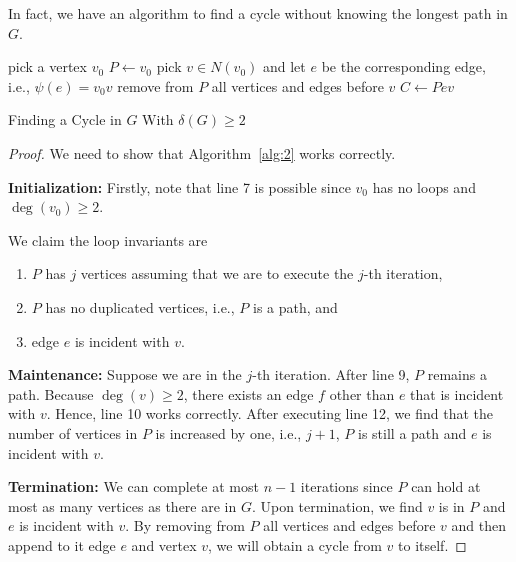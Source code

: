 \documentclass[thmcnt=section, 12pt, color=cyan]{my-elegantbook}
\begin{document}
In fact, we have an algorithm to find a cycle without knowing the longest path in $G$.

\begin{algorithm}[ht]
    pick a vertex $v_0$ \; 
    $P \gets v_0$ \;
    pick $v \in N(v_0)$ and let $e$ be the corresponding edge, i.e., $\psi(e) = v_0 v$ \;
    remove from $P$ all vertices and edges before $v$ \;
    $C \gets P e v$ \;
    \caption{Finding a Cycle in $G$ With $\delta(G) \geq 2$}
    \label{alg:2}
\end{algorithm}

\begin{proof}
We need to show that Algorithm~\ref{alg:2} works correctly. 
    
\noindent \textbf{Initialization:} Firstly, note that line 7 is possible 
since $v_0$ has no loops and $\deg(v_0) \geq 2$. 

We claim the loop invariants are
\begin{enumerate}
    \item $P$ has $j$ vertices assuming that 
		we are to execute the $j$-th iteration,
    \item $P$ has no duplicated vertices, i.e., $P$ is a path, and
    \item edge $e$ is incident with $v$.
\end{enumerate}

\noindent \textbf{Maintenance:} Suppose we are in the $j$-th iteration. 
After line 9, $P$ remains a path. Because $\deg(v) \geq 2$, 
there exists an edge $f$ other than $e$ that is incident with $v$. 
Hence, line 10 works correctly. 
After executing line 12, we find that the number of vertices in $P$ is increased by one, i.e., $j+1$, 
$P$ is still a path and $e$ is incident with $v$.

\noindent \textbf{Termination:} We can complete at most $n-1$ iterations 
since $P$ can hold at most as many vertices as there are in $G$. 
Upon termination, 
we find $v$ is in $P$ and $e$ is incident with $v$. 
By removing from $P$ all vertices and edges before $v$ 
and then append to it edge $e$ and vertex $v$, 
we will obtain a cycle from $v$ to itself. 
\end{proof}
\end{document}
